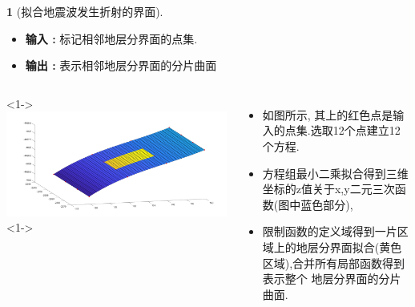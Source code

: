 \documentclass[UTF8]{ctexbeamer}	%
\newcommand{\N}{\mathbb{N}}
\theoremstyle{plain}
\newtheorem{cor}{Corollary}[section]
\theoremstyle{definition}
\newtheorem{emt}{}[section]
\theoremstyle{remark}
\numberwithin{equation}{section}
\begin{document}
\begin{frame}
  \begin{emt}[拟合地震波发生折射的界面]
    \begin{itemize}
        \item \textbf{输入 : } 标记相邻地层分界面的点集.
        \item \textbf{输出 : } 表示相邻地层分界面的分片曲面
    \end{itemize}
    
    \begin{columns}
        <1->
        \includegraphics[width = \textwidth]{fig/s2p2.png}
        <1->
        \begin{itemize}
        \item 如图所示, 其上的红色点是输入的点集.选取12个点建立12个方程.
        \item 方程组最小二乘拟合得到三维坐标的z值关于x,y二元三次函数(图中蓝色部分),
        \item 限制函数的定义域得到一片区域上的地层分界面拟合(黄色区域),合并所有局部函数得到表示整个
        地层分界面的分片曲面.
        \end{itemize}
    \end{columns}

      
  \end{emt}
\end{frame}






\end{document}
